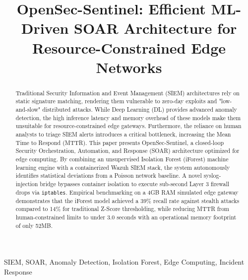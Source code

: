 \documentclass[conference]{IEEEtran}
\begin{document}
	
	\title{OpenSec-Sentinel: Efficient ML-Driven SOAR Architecture for Resource-Constrained Edge Networks}
	
	\author{
	}
	
	\maketitle
	
	\begin{abstract}
		Traditional Security Information and Event Management (SIEM) architectures rely on static signature matching, rendering them vulnerable to zero-day exploits and "low-and-slow" distributed attacks. While Deep Learning (DL) provides advanced anomaly detection, the high inference latency and memory overhead of these models make them unsuitable for resource-constrained edge gateways. Furthermore, the reliance on human analysts to triage SIEM alerts introduces a critical bottleneck, increasing the Mean Time to Respond (MTTR). This paper presents OpenSec-Sentinel, a closed-loop Security Orchestration, Automation, and Response (SOAR) architecture optimized for edge computing. By combining an unsupervised Isolation Forest (iForest) machine learning engine with a containerized Wazuh SIEM stack, the system autonomously identifies statistical deviations from a Poisson network baseline. A novel syslog-injection bridge bypasses container isolation to execute sub-second Layer 3 firewall drops via \texttt{iptables}. Empirical benchmarking on a 4GB RAM simulated edge gateway demonstrates that the iForest model achieved a 39\% recall rate against stealth attacks compared to 14\% for traditional Z-Score thresholding, while reducing MTTR from human-constrained limits to under 3.0 seconds with an operational memory footprint of only 52MB.
	\end{abstract}
	
	\begin{IEEEkeywords}
		SIEM, SOAR, Anomaly Detection, Isolation Forest, Edge Computing, Incident Response
	\end{IEEEkeywords}
	
\end{document}
